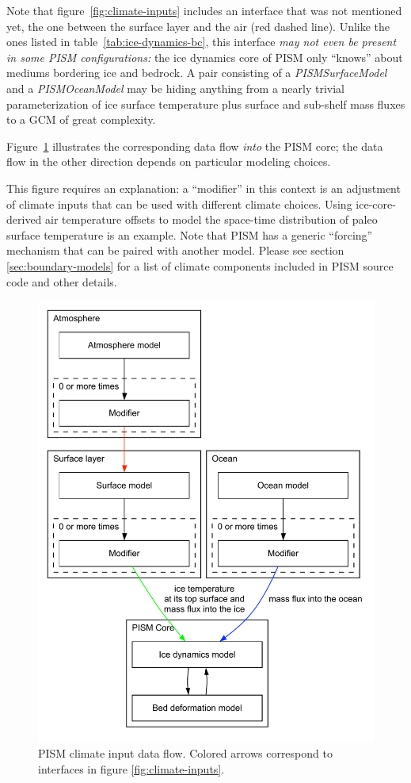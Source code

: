 \documentclass[titlepage,letterpaper,final]{scrartcl}
\begin{document}
Note that figure~\ref{fig:climate-inputs} includes an interface that was not
mentioned yet, the one between the surface layer and the air (red dashed line).
Unlike the ones listed in table~\ref{tab:ice-dynamics-bc}, this interface
\emph{may not even be present in some PISM configurations:} the ice dynamics
core of PISM only ``knows'' about mediums bordering ice and bedrock. A pair
consisting of a \emph{PISMSurfaceModel} and a \emph{PISMOceanModel} may be
hiding anything from a nearly trivial parameterization of ice surface
temperature plus surface and sub-shelf mass fluxes to a GCM of great
complexity.

Figure~\ref{fig:climate-input-data-flow} illustrates the corresponding data
flow \emph{into} the PISM core; the data flow in the other direction depends on
particular modeling choices.

This figure requires an explanation: a ``modifier'' in this context is an
adjustment of climate inputs that can be used with different climate
choices.  Using ice-core-derived air temperature offsets to model the space-time distribution of paleo surface temperature is an example.  Note that PISM has a generic ``forcing'' mechanism that can be paired with another model. Please see section \ref{sec:boundary-models} for
a list of climate components included in PISM source code and other details.

\begin{figure}
  \centering
  \includegraphics[width=5in]{figs/data-flow.pdf}
  \caption{PISM climate input data flow. Colored arrows correspond to interfaces in
    figure \ref{fig:climate-inputs}.}
  \label{fig:climate-input-data-flow}
\end{figure}
\end{document}
